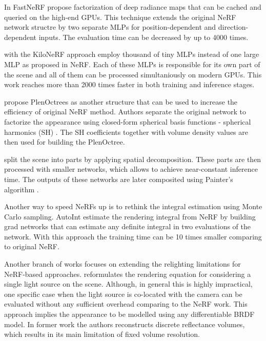 In FastNeRF \cite{garbin2021fastnerf} propose factorization of deep radiance maps
that can be cached and queried on the high-end GPUs.
This technique extends the original NeRF network structre
by two separate MLPs for position-dependent and direction-dependent inputs.
The evaluation time can be decreased by up to 4000 times.

\cite{reiser2021kilonerf} with the KiloNeRF approach employ thousand of tiny MLPs 
instead of one large MLP as proposed in NeRF.
Each of these MLPs is responsible for its own part of the scene
and all of them can be processed simultaniously on modern GPUs.
This work reaches more than 2000 times faster in both training and inference stages.

\cite{yu2021plenoctrees} propose PlenOctrees as another structure that can be used to increase the efficiency of original NeRF method.
Authors separate the original network to factorize the appearance using closed-form
spherical basis functions - spherical harmonics (SH) \cite{mohlenkamp1997spherical}.
The SH coefficients together with volume density values are then used
for building the PlenOctree.

\cite{rebain2020derf} split the scene into parts by applying spatial decomposition.
These parts are then processed with smaller networks, which allows to achieve near-constant inference time.
The outputs of these networks are later composited using Painter's algorithm \cite{deBerg2008}.

Another way to speed NeRFs up is to rethink the integral estimation using Monte Carlo sampling.
AutoInt \cite{lindell2021autoint} estimate the rendering integral from NeRF
by building grad networks that can estimate any definite integral in two evaluations of the network.
With this approach the training time can be 10 times smaller comparing to original NeRF.

Another branch of works focuses on extending the relighting limitations for NeRF-based approaches.
\cite{bi2020neural} reformulates the rendering equation for considering a single light source on the scene.
Although, in general this is highly impractical, one specific case
when the light source is co-located with the camera can be evaluated
without any sufficient overhead comparing to the NeRF work.
This approach implies the appearance to be modelled using any differentiable BRDF model.
In former work \cite{bi2020deep} the authors reconstructs discrete reflectance volumes,
which results in its main limitation of fixed volume resolution.



